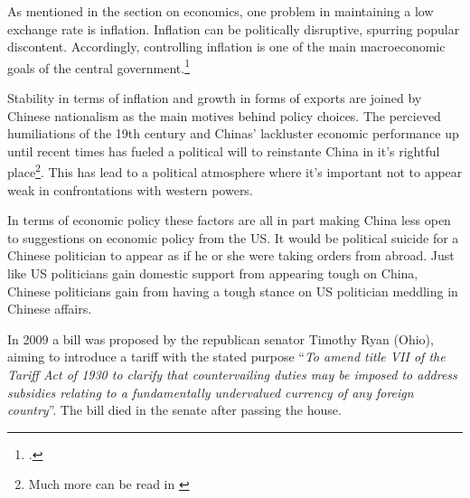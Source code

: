 As mentioned in the section on economics, one problem in maintaining a 
low exchange rate is inflation. Inflation can be politically disruptive, 
spurring popular discontent. Accordingly, controlling inflation is one 
of the main macroeconomic goals of the central 
government.\footnote{\cite{Naugthon2011}.}

Stability in terms of inflation and growth in forms of exports are 
joined by Chinese nationalism as the main motives behind policy choices.  
The percieved humiliations of the 19th century and Chinas' lackluster 
economic performance up until recent times has fueled a political will 
to reinstante China in it's rightful place\footnote{Much more can be 
read in \cite{hughes2006}}. This has lead to a political atmosphere 
where it's important not to appear weak in confrontations with western 
powers.

In terms of economic policy these factors are all in part making China 
less open to suggestions on economic policy from the US. It would be 
political suicide for a Chinese politician to appear as if he or she 
were taking orders from abroad.  Just like US politicians gain domestic 
support from appearing tough on China, Chinese politicians gain from 
having a tough stance on US politician meddling in Chinese affairs.

% 
% 
% 
% 
% 


In 2009 a bill was proposed by the republican senator Timothy Ryan 
(Ohio), aiming to introduce a tariff with the stated purpose 
``\textit{To amend title VII of the Tariff Act of 1930 to clarify that 
	countervailing duties may be imposed to address subsidies relating 
	to a fundamentally undervalued currency of any foreign 
country}''\cite{Ryan2009}. The bill died in the senate after passing the 
house.


